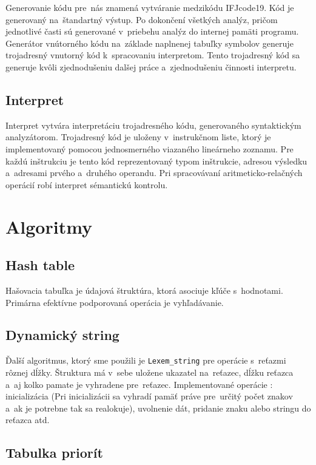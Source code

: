 \documentclass[a4paper, 11pt]{article}
\begin{document}
    Generovanie kódu pre~nás znamená vytváranie medzikódu IFJcode19. Kód je generovaný na~štandartný výstup. Po dokončení všetkých analýz, pričom jednotlivé časti sú generované v~priebehu analýz do internej pamäti programu. Generátor vnútorného kódu na~základe naplnenej tabuľky symbolov generuje trojadresný vnutorný kód k~spracovaniu interpretom. Tento trojadresný kód sa generuje kvôli zjednodušeniu dalšej práce a~zjednodušeniu činnosti interpretu.
    
    \subsection{Interpret}
    
    Interpret vytvára interpretáciu trojadresného kódu, generovaného syntaktickým analyzátorom. Trojadresný kód je uloženy v~instrukčnom liste, ktorý je implementovaný pomocou jednosmerného viazaného lineárneho zoznamu. Pre každú inštrukciu je tento kód reprezentovaný typom inštrukcie, adresou výsledku a~adresami prvého a~druhého operandu. Pri spracovávaní aritmeticko-relačných operácií robí interpret sémantickú kontrolu.
    
    \pagebreak
    \section{Algoritmy}
    \subsection{Hash table}
    
    Hašovacia tabuľka je údajová štruktúra, ktorá asociuje kľúče s~hodnotami. Primárna efektívne podporovaná operácia je vyhľadávanie.
    
    \subsection{Dynamický string}
    
    Ďalší algoritmus, ktorý sme použili je \texttt{Lexem\_string} pre operácie s~reťazmi rôznej dĺžky. Štruktura má v~sebe uložene ukazatel na~reťazec, dĺžku reťazca a~aj kolko pamate je vyhradene pre~reťazec. Implementované operácie : inicializácia (Pri inicializácii sa vyhradí pamäť práve pre~určitý počet znakov a~ak je potrebne tak sa realokuje), uvolnenie dát, pridanie znaku alebo stringu do reťazca atd.
    
    \subsection{Tabulka priorít}
    
\end{document}
